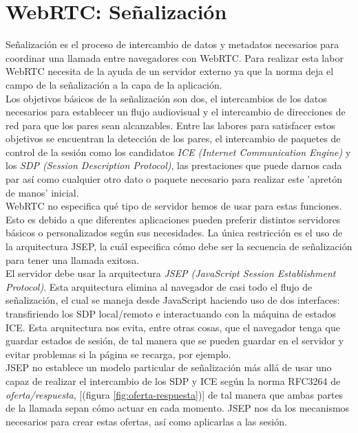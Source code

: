 \section{WebRTC: Señalización} 
\label{sec:senalizacion}

Señalización es el proceso de intercambio de datos y metadatos necesarios para coordinar una llamada entre navegadores con WebRTC. Para realizar esta labor WebRTC necesita de la ayuda de un servidor externo ya que la norma deja el campo de la señalización a la capa de la aplicación.\\

Los objetivos básicos de la señalización son dos, el intercambios de los datos necesarios para establecer un flujo audiovisual y el intercambio de direcciones de red para que los pares sean alcanzables. Entre las labores para satisfacer estos objetivos se encuentran la detección de los pares, el intercambio de paquetes de control de la sesión como los candidatos \emph{ICE (Internet Communication Engine)} y los \emph{SDP (Session Description Protocol)}, las prestaciones que puede darnos cada par así como cualquier otro dato o paquete necesario para realizar este 'apretón de manos' inicial.\\

WebRTC no especifica qué tipo de servidor hemos de usar para estas funciones. Esto es debido a que diferentes aplicaciones pueden preferir distintos servidores básicos o personalizados según sus necesidades. La única restricción es el uso de la arquitectura JSEP, la cuál especifica cómo debe ser la secuencia de señalización para tener una llamada exitosa.\\


El servidor debe usar la arquitectura \emph{JSEP (JavaScript Session Establishment Protocol)}. Esta arquitectura elimina al navegador de casi todo el flujo de señalización, el cual se maneja desde JavaScript haciendo uso de dos interfaces: transfiriendo los SDP local/remoto e interactuando con la máquina de estados ICE. Esta arquitectura nos evita, entre otras cosas, que el navegador tenga que guardar estados de sesión, de tal manera que se pueden guardar en el servidor y evitar problemas si la página se recarga, por ejemplo. \\

JSEP no establece un modelo particular de señalización más allá de usar uno capaz de realizar el intercambio de los SDP y ICE según la norma RFC3264 de \emph{oferta/respuesta}, [(figura \ref{fig:oferta-respuesta})] de tal manera que ambas partes de la llamada sepan cómo actuar en cada momento. JSEP nos da los mecanismos necesarios para crear estas ofertas, así como aplicarlas a las sesión.\\

